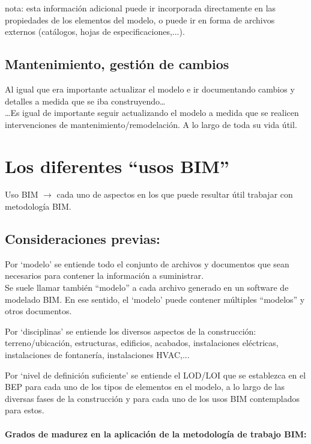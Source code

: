 \documentclass[spanish,12pt,a4paper,final,oneside]{book}
\begin{document}
nota: esta información adicional puede ir incorporada directamente en las propiedades de los elementos del modelo, o puede ir en forma de archivos externos (catálogos, hojas de especificaciones,...).

\section{Mantenimiento, gestión de cambios}
Al igual que era importante actualizar el modelo e ir documentando cambios y detalles a medida que se iba construyendo\ldots 
\\ \ldots Es igual de importante seguir actualizando el modelo a medida que se realicen intervenciones de mantenimiento/remodelación. A lo largo de toda su vida útil.

\chapter{Los diferentes ``usos BIM''}
Uso BIM $\rightarrow$ cada uno de aspectos en los que puede resultar útil trabajar con metodología BIM.


\section{Consideraciones previas:}

Por `modelo' se entiende todo el conjunto de archivos y documentos que sean necesarios para contener la información a suministrar.
\\{\footnotesize Se suele llamar también ``modelo'' a cada archivo generado en un software de modelado BIM. En ese sentido, el `modelo' puede contener múltiples ``modelos'' y otros documentos.}

Por `disciplinas' se entiende los diversos aspectos de la construcción: terreno/ubicación, estructuras, edificios, acabados, instalaciones eléctricas, instalaciones de fontanería, instalaciones HVAC,...

Por `nivel de definición suficiente' se entiende el LOD/LOI que se establezca en el BEP para cada uno de los tipos de elementos en el modelo, a lo largo de las diversas fases de la construcción y para cada uno de los usos BIM contemplados para estos.




\subsubsection{Grados de madurez en la aplicación de la metodología de trabajo BIM:}
\end{document}
